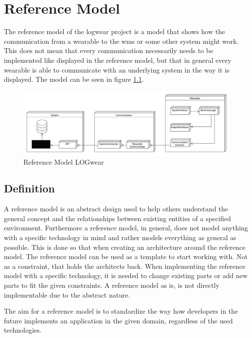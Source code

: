 \chapter{Reference Model}\label{cha:reference}
The \gls{reference model} of the logwear project is a model that shows how the communication from a wearable to the \gls{wms} or some other system might work. This does not mean that every communication necessarily needs to be implemented like displayed in the \gls{reference model}, but that in general every wearable is able to communicate with an underlying system in the way it is displayed.
The model can be seen in figure \ref{fig:referenceModel}.
\begin{figure}[htbp]
	\includegraphics[width=\linewidth]{images/PackageModel_ReferenceArchitecture}
	\caption{Reference Model LOGwear}
	\label{fig:referenceModel}
\end{figure}

\section{Definition}
A \gls{reference model} is an abstract design used to help others understand the general concept and the relationships between existing entities of a specified environment. Furthermore a \gls{reference model}, in general, does not model anything with a specific technology in mind and rather models everything as general as possible. This is done so that when creating an architecture around the \gls{reference model}. The \gls{reference model} can be used as a template to start working with. Not as a constraint, that holds the architects back. When implementing the \gls{reference model} with a specific technology, it is needed to change existing parts or add new parts to fit the given constraints. A \gls{reference model} as is, is not directly implementable due to the abstract nature.

The aim for a \gls{reference model} is to standardize the way how developers in the future implements an application in the given domain, regardless of the used technologies.\citep{website:oasis-rm}

